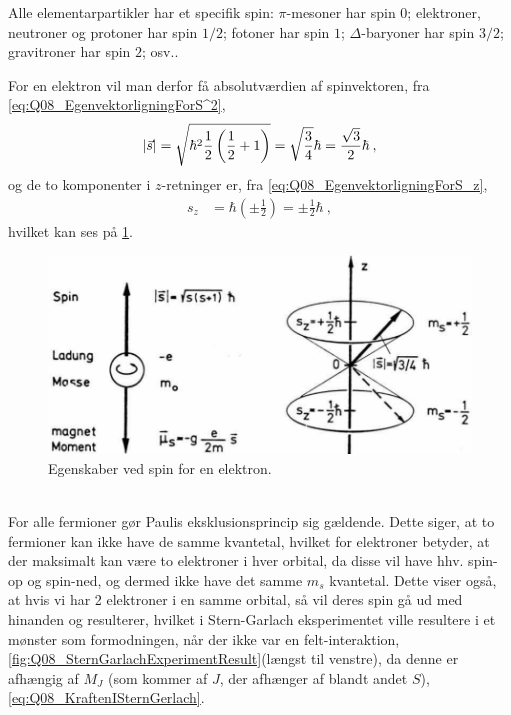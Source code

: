 Alle elementarpartikler har et specifik spin: $\pi$-mesoner har spin $0$; elektroner, neutroner og protoner har spin $1/2$; fotoner har spin $1$; $\Delta$-baryoner har spin $3/2$; gravitroner har spin $2$; osv..

\noindent
For en elektron vil man derfor få absolutværdien af spinvektoren, fra \cref{eq:Q08_EgenvektorligningForS^2},
\begin{align}
    \abs{\Vec{s}} &= \sqrt{\hbar^2 \frac{1}{2}\left(\frac{1}{2}+1\right)} = \sqrt{\frac{3}{4}}\hbar = \frac{\sqrt{3}}{2} \hbar  \: , \\
\end{align}
og de to komponenter i $z$-retninger er, fra \cref{eq:Q08_EgenvektorligningForS_z},
\begin{align}
    s_z &= \hbar \left(\pm \frac{1}{2}\right) = \pm \frac{1}{2}\hbar \: ,
\end{align}
hvilket kan ses på \cref{fig:Q08_PropertiesOfSpin}.

\begin{figure}[!h]
    \centering
    \includegraphics[width=\textwidth]{Q08/images/ProportiesOfSpin.PNG}
    \caption{Egenskaber ved spin for en elektron.}
    \label{fig:Q08_PropertiesOfSpin}
\end{figure}
$ $\\

For alle fermioner gør Paulis eksklusionsprincip sig gældende. Dette siger, at to fermioner kan ikke have de samme kvantetal, hvilket for elektroner betyder, at der maksimalt kan være to elektroner i hver orbital, da disse vil have hhv. spin-op og spin-ned, og dermed ikke have det samme $m_s$ kvantetal. Dette viser også, at hvis vi har 2 elektroner i en samme orbital, så vil deres spin gå ud med hinanden og resulterer, hvilket i Stern-Garlach eksperimentet ville resultere i et mønster som formodningen, når der ikke var en felt-interaktion, \cref{fig:Q08_SternGarlachExperimentResult}(længst til venstre), da denne er afhængig af $M_J$ (som kommer af $J$, der afhænger af blandt andet $S$), \cref{eq:Q08_KraftenISternGerlach}.